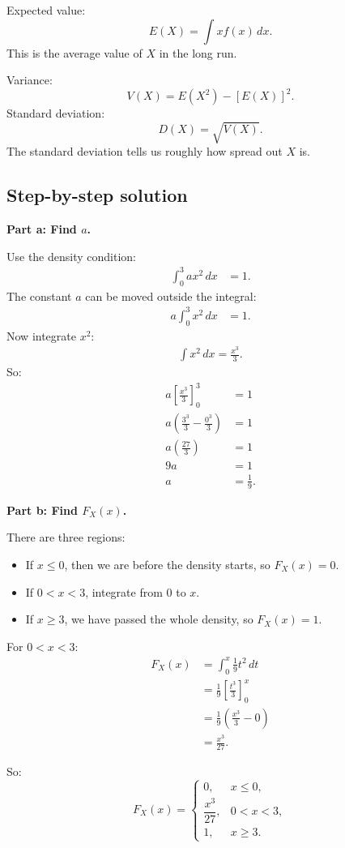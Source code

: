 \documentclass[11pt,a4paper]{article}
\begin{document}
Expected value:
\[
E(X)=\int x f(x)\,dx.
\]
This is the average value of \(X\) in the long run.

Variance:
\[
V(X)=E(X^2)-[E(X)]^2.
\]
Standard deviation:
\[
D(X)=\sqrt{V(X)}.
\]
The standard deviation tells us roughly how spread out \(X\) is.

\subsection*{Step-by-step solution}
\textbf{Part a: Find \(a\).}

Use the density condition:
\begin{align*}
\int_0^3 ax^2\,dx&=1.
\end{align*}
The constant \(a\) can be moved outside the integral:
\begin{align*}
a\int_0^3 x^2\,dx&=1.
\end{align*}
Now integrate \(x^2\):
\begin{align*}
\int x^2\,dx=\frac{x^3}{3}.
\end{align*}
So:
\begin{align*}
a\left[\frac{x^3}{3}\right]_0^3&=1\\
a\left(\frac{3^3}{3}-\frac{0^3}{3}\right)&=1\\
a\left(\frac{27}{3}\right)&=1\\
9a&=1\\
a&=\frac{1}{9}.
\end{align*}

\textbf{Part b: Find \(F_X(x)\).}

There are three regions:
\begin{itemize}[leftmargin=*]
    \item If \(x\le 0\), then we are before the density starts, so \(F_X(x)=0\).
    \item If \(0<x<3\), integrate from \(0\) to \(x\).
    \item If \(x\ge 3\), we have passed the whole density, so \(F_X(x)=1\).
\end{itemize}

For \(0<x<3\):
\begin{align*}
F_X(x)
&=\int_0^x \frac{1}{9}t^2\,dt\\
&=\frac{1}{9}\left[\frac{t^3}{3}\right]_0^x\\
&=\frac{1}{9}\left(\frac{x^3}{3}-0\right)\\
&=\frac{x^3}{27}.
\end{align*}

So:
\[
F_X(x)=
\begin{cases}
0, & x\le 0,\\[1mm]
\dfrac{x^3}{27}, & 0<x<3,\\[2mm]
1, & x\ge 3.
\end{cases}
\]
\end{document}
